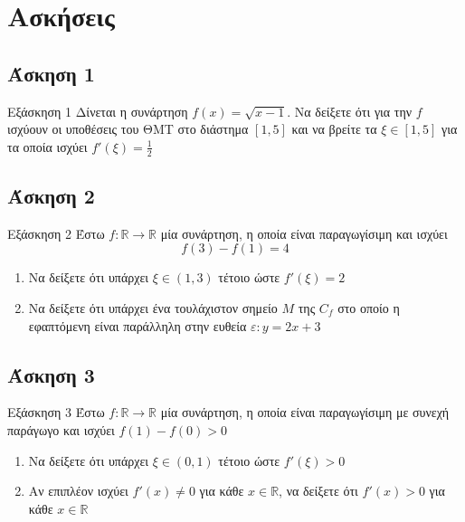\documentclass[greek]{beamer}
\begin{document}
\section{Ασκήσεις}
\subsection{Άσκηση 1}
\begin{frame}[label=Άσκηση1]{Εξάσκηση 1}
 Δίνεται η συνάρτηση $f(x)=\sqrt{x-1}$. Να δείξετε ότι για την $f$ ισχύουν οι υποθέσεις του ΘΜΤ στο διάστημα $[1,5]$ και να βρείτε τα $ξ\in [1,5]$ για τα οποία ισχύει $f'(ξ)=\frac{1}{2}$

\end{frame}

\subsection{Άσκηση 2}
\begin{frame}[label=Άσκηση2]{Εξάσκηση 2}
 Έστω $f:\mathbb{R}\to\mathbb{R}$ μία συνάρτηση, η οποία είναι παραγωγίσιμη και ισχύει
 $$f(3)-f(1)=4$$
 \begin{enumerate}
  \item<1-> Να δείξετε ότι υπάρχει $ξ\in (1,3)$ τέτοιο ώστε $f'(ξ)=2$
  \item<2-> Να δείξετε ότι υπάρχει ένα τουλάχιστον σημείο $Μ$ της $C_f$ στο οποίο η εφαπτόμενη είναι παράλληλη στην ευθεία $ε:y=2x+3$
 \end{enumerate}

\end{frame}

\subsection{Άσκηση 3}
\begin{frame}[label=Άσκηση3]{Εξάσκηση 3}
 Έστω $f:\mathbb{R}\to\mathbb{R}$ μία συνάρτηση, η οποία είναι παραγωγίσιμη με συνεχή παράγωγο και ισχύει $f(1)-f(0)>0$
 \begin{enumerate}
  \item<1-> Να δείξετε ότι υπάρχει $ξ\in (0,1)$ τέτοιο ώστε $f'(ξ)>0$
  \item<2-> Αν επιπλέον ισχύει $f'(x)\ne 0$ για κάθε $x\in\mathbb{R}$, να δείξετε ότι $f'(x)>0$ για κάθε $x\in\mathbb{R}$
 \end{enumerate}

\end{frame}
\end{document}
